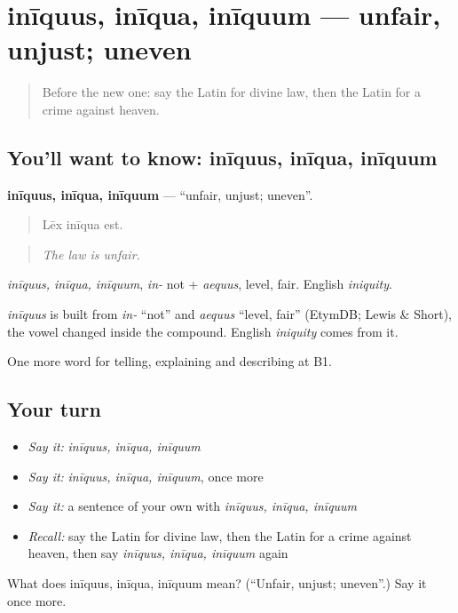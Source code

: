 \section[inīquus, inīqua, inīquum]{inīquus, inīqua, inīquum — unfair, unjust; uneven}

\label{lesson:LA-C414-iniquus}



\begin{quote}
Before the new one: say the Latin for divine law, then the Latin for a crime against heaven.
\end{quote}

\subsection*{You'll want to know: inīquus, inīqua, inīquum}
\textbf{inīquus, inīqua, inīquum} — \textquotedblleft{}unfair, unjust; uneven\textquotedblright{}.

\begin{quote}
Lēx inīqua est.
\end{quote}

\begin{quote}
\emph{The law is unfair.}
\end{quote}

\emph{inīquus, inīqua, inīquum}, \emph{in-} not + \emph{aequus}, level, fair. English \emph{iniquity}.

\begin{cousinweb}
\emph{inīquus} is built from \emph{in-} \textquotedblleft{}not\textquotedblright{} and \emph{aequus} \textquotedblleft{}level, fair\textquotedblright{} (EtymDB; Lewis \& Short), the vowel changed inside the compound. English \emph{iniquity} comes from it.
\end{cousinweb}

\begin{grammarlens}[title={What you've built}]
One more word for telling, explaining and describing at B1.
\end{grammarlens}

\subsection*{Your turn}
\begin{itemize}
\raggedright
  \item \emph{Say it:} \emph{inīquus, inīqua, inīquum}
  \item \emph{Say it:} \emph{inīquus, inīqua, inīquum}, once more
  \item \emph{Say it:} a sentence of your own with \emph{inīquus, inīqua, inīquum}
  \item \emph{Recall:} say the Latin for divine law, then the Latin for a crime against heaven, then say \emph{inīquus, inīqua, inīquum} again
\end{itemize}

\begin{tcolorbox}[breakable,colback=teal!4,colframe=teal!35!black,title={Before you move on}]
What does inīquus, inīqua, inīquum mean? (\textquotedblleft{}Unfair, unjust; uneven\textquotedblright{}.) Say it once more.
\end{tcolorbox}
